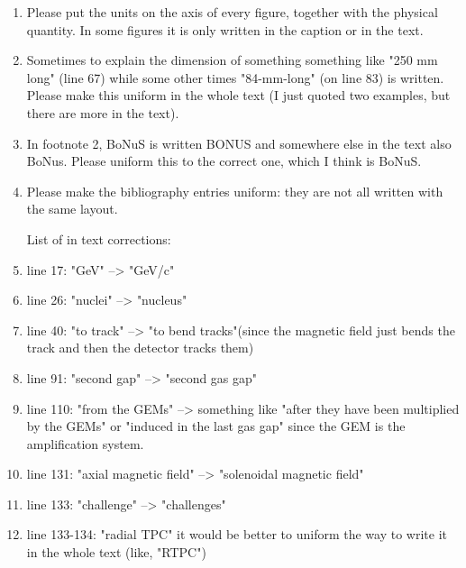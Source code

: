 \documentclass[a4paper,11pt,twoside]{article}
\begin{document}
\begin{enumerate}
\item Please put the units on the axis of every figure, together with the physical quantity. In some figures it is only written in the caption or in the text.
\textcolor{blue}{ } 

\item Sometimes to explain the dimension of something something like "250 mm long" (line 67) while some other times "84-mm-long" (on line 83) is written. Please make this uniform in the whole text (I just quoted two examples, but there are more in the text).
\textcolor{blue}{ } 

\item In footnote 2, BoNuS is written BONUS and somewhere else in the text also BoNus. Please uniform this to the correct one, which I think is BoNuS.
\textcolor{blue}{ } 

\item Please make the bibliography entries uniform: they are not all written with the same layout.
\textcolor{blue}{ } 

List of in text corrections:

\item line 17: "GeV" --> "GeV/c"
\textcolor{blue}{ } 

\item line 26: "nuclei" --> "nucleus"
\textcolor{blue}{ } 

\item line 40: "to track" --> "to bend tracks"(since the magnetic field just bends the track and then the detector tracks them)
\textcolor{blue}{ } 

\item line 91: "second gap" --> "second gas gap"
\textcolor{blue}{ } 

\item line 110: "from the GEMs" -->  something like "after they have been multiplied by the GEMs" or "induced in the last gas gap" since the GEM is the amplification system.
\textcolor{blue}{ } 

\item line 131: "axial magnetic field" --> "solenoidal magnetic field"
\textcolor{blue}{ } 

\item line 133: "challenge" --> "challenges"
\textcolor{blue}{ } 

\item line 133-134: "radial TPC" it would be better to uniform the way to write it in the whole text (like, "RTPC")
\textcolor{blue}{ } 


\end{enumerate}
\end{document}

